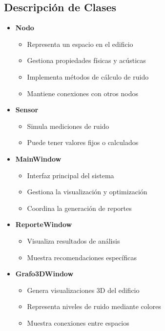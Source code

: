 \documentclass[a4paper,12pt]{article}
\begin{document}
\subsection{Descripción de Clases}
\begin{itemize}
    \item \textbf{Nodo}
    \begin{itemize}
        \item Representa un espacio en el edificio
        \item Gestiona propiedades físicas y acústicas
        \item Implementa métodos de cálculo de ruido
        \item Mantiene conexiones con otros nodos
    \end{itemize}

    \item \textbf{Sensor}
    \begin{itemize}
        \item Simula mediciones de ruido
        \item Puede tener valores fijos o calculados
    \end{itemize}

    \item \textbf{MainWindow}
    \begin{itemize}
        \item Interfaz principal del sistema
        \item Gestiona la visualización y optimización
        \item Coordina la generación de reportes
    \end{itemize}

    \item \textbf{ReporteWindow}
    \begin{itemize}
        \item Visualiza resultados de análisis
        \item Muestra recomendaciones específicas
    \end{itemize}

    \item \textbf{Grafo3DWindow}
    \begin{itemize}
        \item Genera visualizaciones 3D del edificio
        \item Representa niveles de ruido mediante colores
        \item Muestra conexiones entre espacios
    \end{itemize}
\end{itemize}
\end{document}
